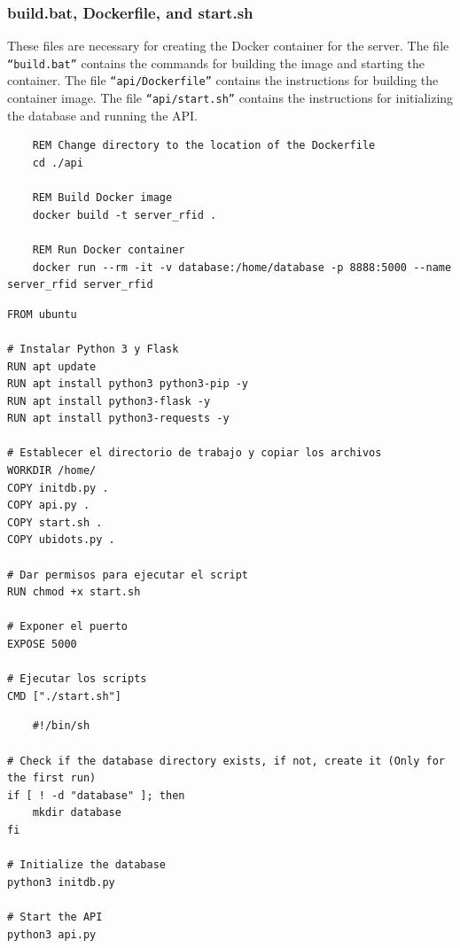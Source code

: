 \documentclass{article}
\begin{document}
\subsubsection{build.bat, Dockerfile, and start.sh}
These files are necessary for creating the Docker container for the server.
The file \texttt{``build.bat''} contains the commands for building the image and starting the container.
The file \texttt{``api/Dockerfile''} contains the instructions for building the container image.
The file \texttt{``api/start.sh''} contains the instructions for initializing the database and running the API.


\begin{lstlisting}
	REM Change directory to the location of the Dockerfile
	cd ./api
	
	REM Build Docker image
	docker build -t server_rfid .
	
	REM Run Docker container
	docker run --rm -it -v database:/home/database -p 8888:5000 --name server_rfid server_rfid	
\end{lstlisting}

\begin{lstlisting}
FROM ubuntu

# Instalar Python 3 y Flask
RUN apt update
RUN apt install python3 python3-pip -y
RUN apt install python3-flask -y
RUN apt install python3-requests -y

# Establecer el directorio de trabajo y copiar los archivos
WORKDIR /home/
COPY initdb.py .
COPY api.py .
COPY start.sh .
COPY ubidots.py .

# Dar permisos para ejecutar el script
RUN chmod +x start.sh

# Exponer el puerto
EXPOSE 5000

# Ejecutar los scripts
CMD ["./start.sh"]

\end{lstlisting}

\begin{lstlisting}
	#!/bin/sh

# Check if the database directory exists, if not, create it (Only for the first run)
if [ ! -d "database" ]; then
    mkdir database
fi

# Initialize the database
python3 initdb.py

# Start the API
python3 api.py
\end{lstlisting}
\end{document}
